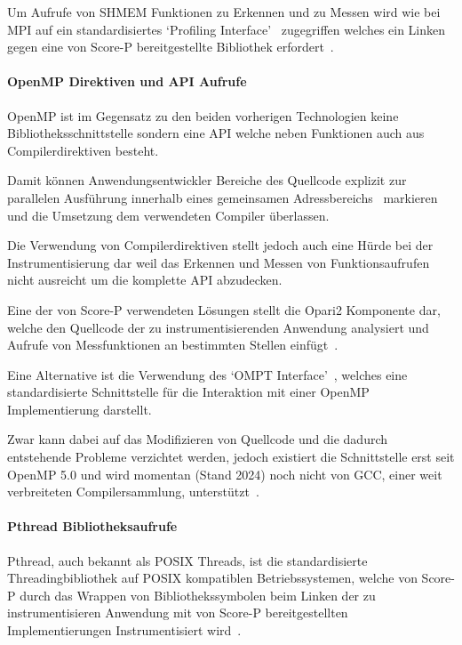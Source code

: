 \documentclass[german,proseminar,hyperref,utf8]{zihpub}
\begin{document}
    Um Aufrufe von SHMEM Funktionen zu Erkennen und zu Messen wird wie bei MPI auf ein standardisiertes
    `Profiling Interface'~ zugegriffen welches ein Linken gegen eine von
    Score-P bereitgestellte Bibliothek erfordert~.

    \paragraph{OpenMP Direktiven und API Aufrufe}
    OpenMP ist im Gegensatz zu den beiden vorherigen Technologien keine Bibliotheksschnittstelle
    sondern eine API welche neben Funktionen auch aus Compilerdirektiven besteht.

    Damit können Anwendungsentwickler Bereiche des Quellcode explizit zur parallelen Ausführung
    innerhalb eines gemeinsamen Adressbereichs~ markieren und die Umsetzung 
    dem verwendeten Compiler überlassen.

    Die Verwendung von Compilerdirektiven stellt jedoch auch eine Hürde bei der Instrumentisierung dar
    weil das Erkennen und Messen von Funktionsaufrufen nicht ausreicht um die komplette API abzudecken.

    Eine der von Score-P verwendeten Lösungen stellt die Opari2 Komponente dar, welche den Quellcode der
    zu instrumentisierenden Anwendung analysiert und Aufrufe von Messfunktionen an bestimmten Stellen
    einfügt~.

    Eine Alternative ist die Verwendung des `OMPT Interface'~, welches eine
    standardisierte Schnittstelle für die Interaktion mit einer OpenMP Implementierung darstellt.

    Zwar kann dabei auf das Modifizieren von Quellcode und die dadurch entstehende Probleme verzichtet werden,
    jedoch existiert die Schnittstelle erst seit OpenMP 5.0 und wird momentan (Stand 2024) noch nicht von
    GCC, einer weit verbreiteten Compilersammlung, unterstützt~\cite{gomp}. 

    \paragraph{Pthread Bibliotheksaufrufe}
    Pthread, auch bekannt als POSIX Threads, ist die standardisierte Threadingbibliothek auf POSIX
    kompatiblen Betriebssystemen, welche von Score-P durch das Wrappen von Bibliothekssymbolen
    beim Linken der zu instrumentisieren Anwendung mit von Score-P bereitgestellten
    Implementierungen Instrumentisiert wird~.
\end{document}
